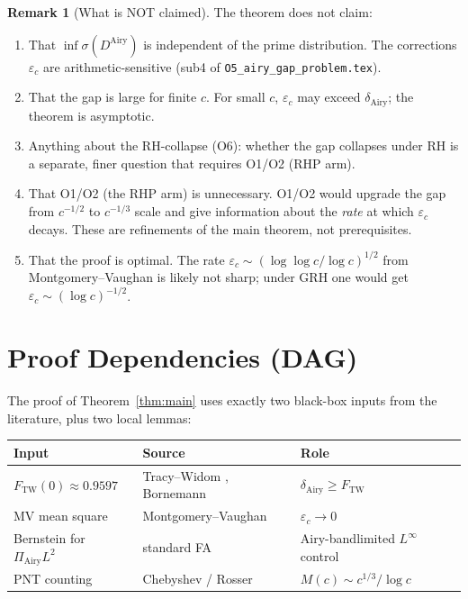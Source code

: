 \documentclass[12pt,a4paper]{amsart}
\theoremstyle{definition}
\newtheorem{remark}[theorem]{Remark}
\newcommand{\DAi}{D^{\mathrm{Airy}}}
\newcommand{\PAi}{\Pi_{\mathrm{Airy}}}
\begin{document}
\begin{remark}[What is NOT claimed]
The theorem does not claim:
\begin{enumerate}
  \item That $\inf\sigma(\DAi)$ is independent of the prime distribution.
    The corrections $\varepsilon_c$ are arithmetic-sensitive
    (sub4 of \texttt{O5\_airy\_gap\_problem.tex}).
  \item That the gap is large for finite $c$.
    For small $c$, $\varepsilon_c$ may exceed $\delta_{\mathrm{Airy}}$;
    the theorem is asymptotic.
  \item Anything about the RH-collapse (O6): whether the gap collapses under RH
    is a separate, finer question that requires O1/O2 (RHP arm).
  \item That O1/O2 (the RHP arm) is unnecessary.
    O1/O2 would upgrade the gap from $c^{-1/2}$ to $c^{-1/3}$ scale
    and give information about the \emph{rate} at which $\varepsilon_c$ decays.
    These are refinements of the main theorem, not prerequisites.
  \item That the proof is optimal. The rate $\varepsilon_c \sim (\log\log c/\log c)^{1/2}$
    from Montgomery--Vaughan is likely not sharp;
    under GRH one would get $\varepsilon_c \sim (\log c)^{-1/2}$.
\end{enumerate}
\end{remark}

\section{Proof Dependencies (DAG)}
\label{sec:dag}

The proof of Theorem~\ref{thm:main} uses exactly two black-box inputs
from the literature, plus two local lemmas:

\begin{center}
\begin{tabular}{lll}
\toprule
Input & Source & Role\\
\midrule
$F_{\mathrm{TW}}(0) \approx 0.9597$ & Tracy--Widom \cite{TW1994}, Bornemann \cite{Bornemann2010} & $\delta_{\mathrm{Airy}} \ge F_{\mathrm{TW}}$\\
MV mean square & Montgomery--Vaughan \cite{MV1974} & $\varepsilon_c \to 0$\\
\midrule
Bernstein for $\PAi L^2$ & standard FA & Airy-bandlimited $L^\infty$ control\\
PNT counting & Chebyshev / Rosser & $M(c) \sim c^{1/3}/\log c$\\
\bottomrule
\end{tabular}
\end{center}
\end{document}
